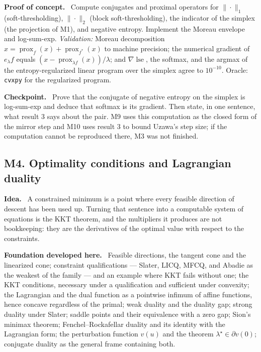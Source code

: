 \documentclass[11pt,a4paper]{article}
\newcommand{\mpart}[1]{\smallskip\noindent\textbf{#1}\ \ignorespaces}
\newcommand{\prox}{\operatorname{prox}}
\newcommand{\lse}{\operatorname{lse}}
\begin{document}
\mpart{Proof of concept.} Compute conjugates and proximal operators for $\|\cdot\|_1$
(soft-thresholding), $\|\cdot\|_2$ (block soft-thresholding), the indicator of the simplex
(the projection of M1), and negative entropy. Implement the Moreau envelope and log-sum-exp.
\emph{Validation:} Moreau decomposition $x=\prox_f(x)+\prox_{f^*}(x)$ to machine precision;
the numerical gradient of $e_\lambda f$ equals $(x-\prox_{\lambda f}(x))/\lambda$; and
$\nabla \lse$, the softmax, and the argmax of the entropy-regularized linear program over the
simplex agree to $10^{-10}$. Oracle: \texttt{cvxpy} for the regularized program.

\mpart{Checkpoint.} Prove that the conjugate of negative entropy on the simplex is log-sum-exp
and deduce that softmax is its gradient. Then state, in one sentence, what result 3 says about
the pair. M9 uses this computation as the closed form of the mirror step and M10 uses result 3
to bound Uzawa's step size; if the computation cannot be reproduced there, M3 was not
finished.

\subsection{M4. Optimality conditions and Lagrangian duality}

\mpart{Idea.} A constrained minimum is a point where every feasible direction of descent has
been used up. Turning that sentence into a computable system of equations is the KKT theorem,
and the multipliers it produces are not bookkeeping: they are the derivatives of the optimal
value with respect to the constraints.

\mpart{Foundation developed here.} Feasible directions, the tangent cone and the linearized
cone; constraint qualifications --- Slater, LICQ, MFCQ, and Abadie as the weakest of the
family --- and an example where KKT fails without one; the KKT conditions, necessary under a
qualification and sufficient under convexity; the Lagrangian and the dual function as a
pointwise infimum of affine functions, hence concave regardless of the primal; weak duality
and the duality gap; strong duality under Slater; saddle points and their equivalence with a
zero gap; Sion's minimax theorem; Fenchel--Rockafellar duality and its identity with the
Lagrangian form; the perturbation function $v(u)$ and the theorem
$\lambda^\star \in \partial v(0)$; conjugate duality as the general frame containing both.
\end{document}

